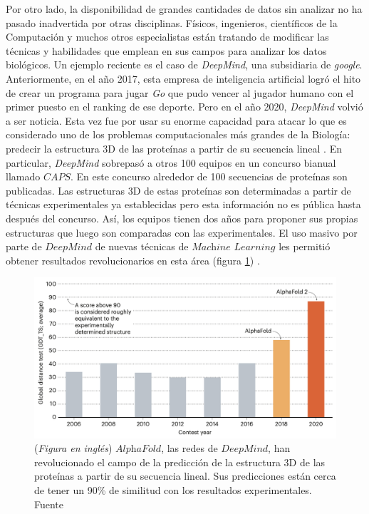 Por otro lado, la disponibilidad de grandes cantidades de datos sin analizar no ha pasado inadvertida por otras disciplinas.
Físicos, ingenieros, científicos de la Computación y muchos otros especialistas están tratando de modificar las técnicas y habilidades que emplean en sus campos para analizar los datos biológicos.
Un ejemplo reciente es el caso de \textit{DeepMind}, una subsidiaria de \textit{google}.
Anteriormente, en el año 2017, esta empresa de inteligencia artificial logró el hito de crear un programa para jugar \textit{Go} que pudo vencer al jugador humano con el primer puesto en el ranking de ese deporte.
Pero en el año 2020, \textit{DeepMind} volvió a ser noticia.
Esta vez fue por usar su enorme capacidad para atacar lo que es considerado uno de los problemas computacionales más grandes de la Biología: predecir la estructura 3D de las proteínas a partir de su secuencia lineal \cite{callawayItWillChange2020}.
En particular, \textit{DeepMind} sobrepasó a otros 100 equipos en un concurso bianual llamado $\textit{CAPS}$.
En este concurso alrededor de 100 secuencias de proteínas son publicadas.
Las estructuras 3D de estas proteínas son determinadas a partir de técnicas experimentales ya establecidas pero esta información no es pública hasta después del concurso.
Así, los equipos tienen dos años para proponer sus propias estructuras que luego son comparadas con las experimentales.
El uso masivo por parte de $\textit{DeepMind}$ de nuevas técnicas de $\textit{Machine Learning}$ les permitió obtener resultados revolucionarios en esta área (figura \ref{fig:Deep_Mind}) \cite{callawayItWillChange2020}.
 
\begin{figure}[tb]
  \centering
  \includegraphics[width=0.9\columnwidth]{images/Deep_Mind.png}
  \caption{
      (\textit{Figura en inglés})
      $\textit{AlphaFold}$, las redes de $\textit{DeepMind}$, han revolucionado el campo de la predicción de la estructura 3D de las proteínas a partir de su secuencia lineal.
      Sus predicciones están cerca de tener un 90\% de similitud con los resultados experimentales.
      Fuente \cite{callawayItWillChange2020}
  }
  \label{fig:Deep_Mind}
\end{figure} 

 

